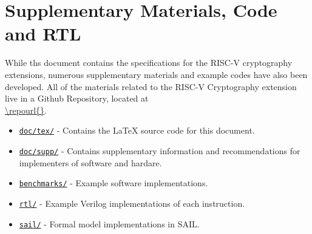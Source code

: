 
%
%

\newpage
\section{Supplementary Materials, Code and RTL}

While ths document contains the specifications for the RISC-V cryptography
extensions, numerous supplementary materials and example codes have
also been developed.
All of the materials related to the RISC-V Cryptography
extension live in a Github Repository, located at\\
\url{\repourl{}}.

\begin{itemize}
\item\href{\repourl{tree/master/doc}}{\tt doc/tex/}
- Contains the \LaTeX\xspace source code for this document.

\item\href{\repourl{tree/master/doc/supp/supplementary-info.adoc}}{\tt doc/supp/}
- Contains supplementary information and recommendations for implementers of
software and hardare.

\item\href{\repourl{tree/master/benchmarks}}{\tt benchmarks/}
- Example software implementations.

\item\href{\repourl{tree/master/rtl}}{\tt rtl/}
- Example Verilog implementations of each instruction.

\item\href{\repourl{tree/dev/next-release/sail}}{\tt sail/}
- Formal model implementations in SAIL.
\end{itemize}
